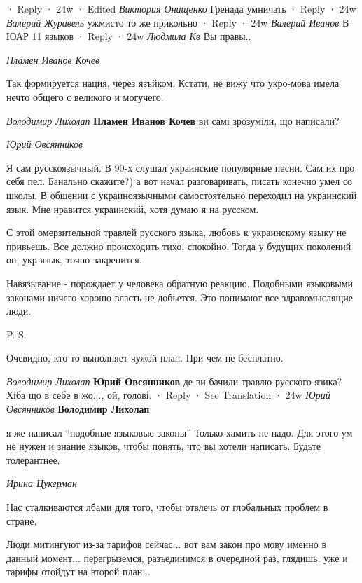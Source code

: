 \begin{itemize}
 · Reply · 24w · Edited
\emph{Виктория Онищенко}
Гренада умничать
 · Reply · 24w
\emph{Валерий Журавель}
ужмисто то же прикольно
 · Reply · 24w
\emph{Валерий Иванов}
В ЮАР 11 языков
 · Reply · 24w
\emph{Людмила Кв}
Вы правы..

\emph{Пламен Иванов Кочев}

Так формируется нация, через язъйком. Кстати, не вижу что укро-мова имела нечто
общего с великого и могучего.

\begin{itemize}
\emph{Володимир Лихолап}
\textbf{Пламен Иванов Кочев} ви самі зрозуміли, що написали?
\end{itemize}

\emph{Юрий Овсянников}

Я сам русскоязычный. В 90-х слушал украинские популярные песни. Сам их про себя
пел. Банально скажите?) а вот начал разговаривать, писать конечно умел со
школы. В общении с украиноязычными самостоятельно переходил на украинский язык.
Мне нравится украинский, хотя думаю я на русском.

С этой омерзительной травлей русского языка, любовь к украинскому языку не
привьешь. Все должно происходить тихо, спокойно. Тогда у будущих поколений он,
укр язык, точно закрепится.

Навязывание - порождает у человека обратную реакцию. Подобными языковыми
законами ничего хорошо власть не добьется. Это понимают все здравомыслящие
люди.

P. S.

Очевидно, кто то выполняет чужой план. При чем не бесплатно.

\begin{itemize}
\emph{Володимир Лихолап}
\textbf{Юрий Овсянников} де ви бачили травлю русского язика? Хіба що в себе в жо..., ой, голові.
 · Reply · See Translation · 24w
\emph{Юрий Овсянников}
\textbf{Володимир Лихолап} 

я же написал \enquote{подобные языковые законы} Только хамить не надо. Для
этого ум не нужен и знание языков, чтобы понять, что вы хотели написать. Будьте
толерантнее.
\end{itemize}

\emph{Ирина Цукерман}

Нас сталкиваются лбами для того, чтобы отвлечь от глобальных проблем в стране.

Люди митингуют из-за тарифов сейчас... вот вам закон про мову именно в данный
момент... перегрыземся, разъединимся в очередной раз, глядишь, уже и тарифы
отойдут на второй план...


\end{itemize}
